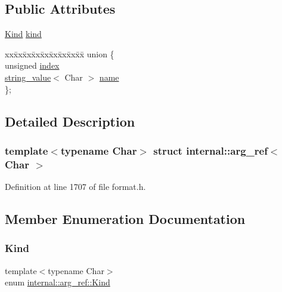 \subsection*{Public Attributes}
\begin{DoxyCompactItemize}
\item 
\hyperlink{structinternal_1_1arg__ref_a2d07deb839e942cac187aa85bdde30a3}{Kind} \hyperlink{structinternal_1_1arg__ref_a25436065015bb69cd626da81e10653f6}{kind}
\item 
\begin{tabbing}
xx\=xx\=xx\=xx\=xx\=xx\=xx\=xx\=xx\=\kill
union \{\\
\>unsigned \hyperlink{structinternal_1_1arg__ref_a888955ce30e4acb797f6a99d2eadb23e}{index}\\
\>\hyperlink{structinternal_1_1string__value}{string\_value}$<$ Char $>$ \hyperlink{structinternal_1_1arg__ref_a65c8e4bff9fc8c99ca857d1be861702a}{name}\\
\}; \\

\end{tabbing}\end{DoxyCompactItemize}


\subsection{Detailed Description}
\subsubsection*{template$<$typename Char$>$\newline
struct internal\+::arg\+\_\+ref$<$ Char $>$}



Definition at line 1707 of file format.\+h.



\subsection{Member Enumeration Documentation}
\mbox{\label{structinternal_1_1arg__ref_a2d07deb839e942cac187aa85bdde30a3}} 
\subsubsection{\texorpdfstring{Kind}{Kind}}
{\footnotesize\ttfamily template$<$typename Char$>$ \\
enum \hyperlink{structinternal_1_1arg__ref_a2d07deb839e942cac187aa85bdde30a3}{internal\+::arg\+\_\+ref\+::\+Kind}}

